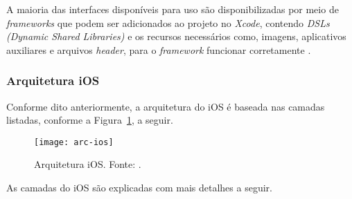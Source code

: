A maioria das interfaces disponíveis para uso são disponibilizadas por meio de \textit{frameworks} que podem ser adicionados ao projeto no \textit{Xcode}, contendo \textit{DSLs (Dynamic Shared Libraries)} e os recursos necessários como, 
imagens, aplicativos auxiliares e arquivos \textit{header}, para o \textit{framework} funcionar corretamente \cite{apple_inc_tech_2014}.

\subsubsection{Arquitetura iOS} \label{subsubsection:arc-ios}
Conforme dito anteriormente, a arquitetura do iOS é baseada nas camadas listadas, conforme a Figura~\ref{fig:arc-ios}, a seguir.
 
\begin{figure}[H]
  \centering
    \texttt{[image: arc-ios]}
    \caption[Arquitetura iOS]{ Arquitetura iOS. Fonte: \cite{apple_inc_tech_2014}.}
	\label{fig:arc-ios}
\end{figure}

As camadas do iOS são explicadas com mais detalhes a seguir.
 
